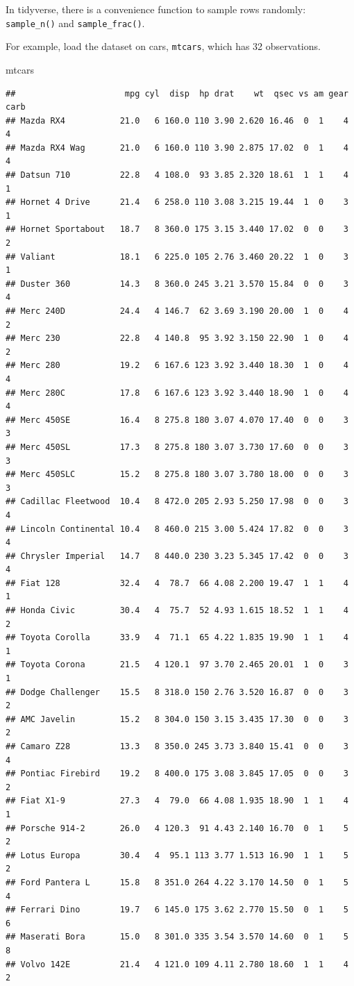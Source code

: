 \documentclass[]{book}
\newenvironment{Shaded}{\begin{snugshade}}{\end{snugshade}}
\newcommand{\NormalTok}[1]{#1}
\theoremstyle{definition}
\theoremstyle{definition}
\theoremstyle{definition}
\theoremstyle{remark}
\begin{document}
In tidyverse, there is a convenience function to sample rows randomly:
\texttt{sample\_n()} and \texttt{sample\_frac()}.

For example, load the dataset on cars, \texttt{mtcars}, which has 32
observations.

\begin{Shaded}
\begin{Highlighting}[]
\NormalTok{mtcars}
\end{Highlighting}
\end{Shaded}

\begin{verbatim}
##                      mpg cyl  disp  hp drat    wt  qsec vs am gear carb
## Mazda RX4           21.0   6 160.0 110 3.90 2.620 16.46  0  1    4    4
## Mazda RX4 Wag       21.0   6 160.0 110 3.90 2.875 17.02  0  1    4    4
## Datsun 710          22.8   4 108.0  93 3.85 2.320 18.61  1  1    4    1
## Hornet 4 Drive      21.4   6 258.0 110 3.08 3.215 19.44  1  0    3    1
## Hornet Sportabout   18.7   8 360.0 175 3.15 3.440 17.02  0  0    3    2
## Valiant             18.1   6 225.0 105 2.76 3.460 20.22  1  0    3    1
## Duster 360          14.3   8 360.0 245 3.21 3.570 15.84  0  0    3    4
## Merc 240D           24.4   4 146.7  62 3.69 3.190 20.00  1  0    4    2
## Merc 230            22.8   4 140.8  95 3.92 3.150 22.90  1  0    4    2
## Merc 280            19.2   6 167.6 123 3.92 3.440 18.30  1  0    4    4
## Merc 280C           17.8   6 167.6 123 3.92 3.440 18.90  1  0    4    4
## Merc 450SE          16.4   8 275.8 180 3.07 4.070 17.40  0  0    3    3
## Merc 450SL          17.3   8 275.8 180 3.07 3.730 17.60  0  0    3    3
## Merc 450SLC         15.2   8 275.8 180 3.07 3.780 18.00  0  0    3    3
## Cadillac Fleetwood  10.4   8 472.0 205 2.93 5.250 17.98  0  0    3    4
## Lincoln Continental 10.4   8 460.0 215 3.00 5.424 17.82  0  0    3    4
## Chrysler Imperial   14.7   8 440.0 230 3.23 5.345 17.42  0  0    3    4
## Fiat 128            32.4   4  78.7  66 4.08 2.200 19.47  1  1    4    1
## Honda Civic         30.4   4  75.7  52 4.93 1.615 18.52  1  1    4    2
## Toyota Corolla      33.9   4  71.1  65 4.22 1.835 19.90  1  1    4    1
## Toyota Corona       21.5   4 120.1  97 3.70 2.465 20.01  1  0    3    1
## Dodge Challenger    15.5   8 318.0 150 2.76 3.520 16.87  0  0    3    2
## AMC Javelin         15.2   8 304.0 150 3.15 3.435 17.30  0  0    3    2
## Camaro Z28          13.3   8 350.0 245 3.73 3.840 15.41  0  0    3    4
## Pontiac Firebird    19.2   8 400.0 175 3.08 3.845 17.05  0  0    3    2
## Fiat X1-9           27.3   4  79.0  66 4.08 1.935 18.90  1  1    4    1
## Porsche 914-2       26.0   4 120.3  91 4.43 2.140 16.70  0  1    5    2
## Lotus Europa        30.4   4  95.1 113 3.77 1.513 16.90  1  1    5    2
## Ford Pantera L      15.8   8 351.0 264 4.22 3.170 14.50  0  1    5    4
## Ferrari Dino        19.7   6 145.0 175 3.62 2.770 15.50  0  1    5    6
## Maserati Bora       15.0   8 301.0 335 3.54 3.570 14.60  0  1    5    8
## Volvo 142E          21.4   4 121.0 109 4.11 2.780 18.60  1  1    4    2
\end{verbatim}
\end{document}
